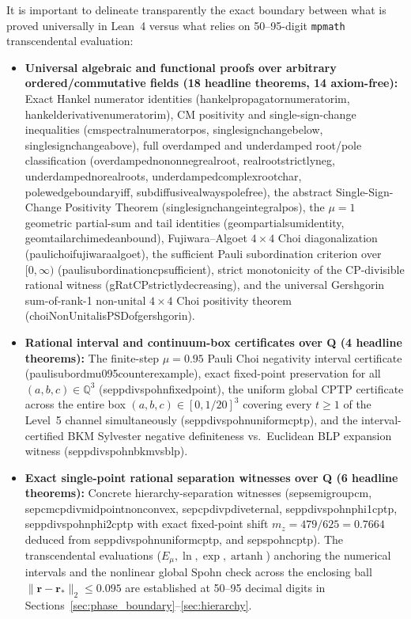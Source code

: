 \documentclass[twocolumn,10pt,amsmath,amssymb,floatfix]{revtex4-2}
\theoremstyle{plain}
\theoremstyle{definition}
\newcommand{\leanid}[1]{{\footnotesize\ttfamily\def\_{\textunderscore\penalty0\hspace{0pt}}#1}}
\begin{document}
It is important to delineate transparently the exact boundary between what is proved universally in Lean~4 versus what relies on 50--95-digit \texttt{mpmath} transcendental evaluation:
{\raggedright
\begin{itemize}[leftmargin=1.4em,itemsep=2pt]
\item \textbf{Universal algebraic and functional proofs over arbitrary ordered/commutative fields (18 headline theorems, 14 axiom-free):} Exact Hankel numerator identities (\leanid{hankel\_propagator\_numerator\_im}, \leanid{hankel\_derivative\_numerator\_im}), CM positivity and single-sign-change inequalities (\leanid{cm\_spectral\_numerator\_pos}, \leanid{single\_sign\_change\_below}, \leanid{single\_sign\_change\_above}), full overdamped and underdamped root/pole classification (\leanid{overdamped\_no\_nonneg\_real\_root}, \leanid{real\_root\_strictly\_neg}, \leanid{underdamped\_no\_real\_roots}, \leanid{underdamped\_complex\_root\_char}, \leanid{pole\_wedge\_boundary\_iff}, \leanid{subdiffusive\_always\_pole\_free}), the abstract Single-Sign-Change Positivity Theorem (\leanid{single\_sign\_change\_integral\_pos}), the $\mu=1$ geometric partial-sum and tail identities (\leanid{geom\_partial\_sum\_identity}, \leanid{geom\_tail\_archimedean\_bound}), Fujiwara--Algoet $4\times 4$ Choi diagonalization (\leanid{pauli\_choi\_fujiwara\_algoet}), the sufficient Pauli subordination criterion over $[0,\infty)$ (\leanid{pauli\_subordination\_cp\_sufficient}), strict monotonicity of the CP-divisible rational witness (\leanid{gRatCP\_strictly\_decreasing}), and the universal Gershgorin sum-of-rank-1 non-unital $4\times 4$ Choi positivity theorem (\leanid{choiNonUnital\_isPSD\_of\_gershgorin}).
\item \textbf{Rational interval and continuum-box certificates over \leanid{Q} (4 headline theorems):} The finite-step $\mu=0.95$ Pauli Choi negativity interval certificate (\leanid{pauli\_subord\_mu095\_counterexample}), exact fixed-point preservation for all $(a,b,c) \in \mathbb{Q}^3$ (\leanid{sep\_pdiv\_spohn\_fixed\_point}), the uniform global CPTP certificate across the entire box $(a,b,c) \in [0, 1/20]^3$ covering every $t \ge 1$ of the Level~5 channel simultaneously (\leanid{sep\_pdiv\_spohn\_uniform\_cptp}), and the interval-certified BKM Sylvester negative definiteness vs.\ Euclidean BLP expansion witness (\leanid{sep\_pdiv\_spohn\_bkm\_vs\_blp}).
\item \textbf{Exact single-point rational separation witnesses over \leanid{Q} (6 headline theorems):} Concrete hierarchy-separation witnesses (\leanid{sep\_semigroup\_cm}, \leanid{sep\_cm\_cpdiv\_midpoint\_nonconvex}, \leanid{sep\_cpdiv\_pdiv\_eternal}, \leanid{sep\_pdiv\_spohn\_phi1\_cptp}, \leanid{sep\_pdiv\_spohn\_phi2\_cptp} with exact fixed-point shift $m_z = 479/625 = 0.7664$ deduced from \leanid{sep\_pdiv\_spohn\_uniform\_cptp}, and \leanid{sep\_spohn\_cptp}). The transcendental evaluations ($E_\mu, \ln, \exp, \operatorname{artanh}$) anchoring the numerical intervals and the nonlinear global Spohn check across the enclosing ball $\|\mathbf{r}-\mathbf{r}_*\|_2 \le 0.095$ are established at 50--95 decimal digits in Sections~\ref{sec:phase_boundary}--\ref{sec:hierarchy}.
\end{itemize}
}
\end{document}

